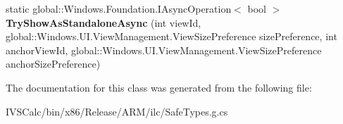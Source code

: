 \begin{DoxyCompactItemize}
\item 
\mbox{\label{class_windows_1_1_u_i_1_1_view_management_1_1_application_view_switcher_ab091393eafced0f1736c11e5129f2023}} 
static global\+::\+Windows.\+Foundation.\+I\+Async\+Operation$<$ bool $>$ {\bfseries Try\+Show\+As\+Standalone\+Async} (int view\+Id, global\+::\+Windows.\+U\+I.\+View\+Management.\+View\+Size\+Preference size\+Preference, int anchor\+View\+Id, global\+::\+Windows.\+U\+I.\+View\+Management.\+View\+Size\+Preference anchor\+Size\+Preference)
\end{DoxyCompactItemize}


The documentation for this class was generated from the following file\+:\begin{DoxyCompactItemize}
\item 
I\+V\+S\+Calc/bin/x86/\+Release/\+A\+R\+M/ilc/Safe\+Types.\+g.\+cs\end{DoxyCompactItemize}
